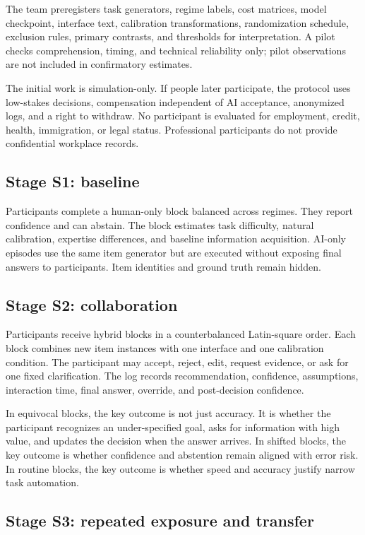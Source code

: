 \documentclass[conference]{IEEEtran}
\begin{document}
The team preregisters task generators, regime labels, cost matrices, model checkpoint, interface text, calibration transformations, randomization schedule, exclusion rules, primary contrasts, and thresholds for interpretation. A pilot checks comprehension, timing, and technical reliability only; pilot observations are not included in confirmatory estimates.

The initial work is simulation-only. If people later participate, the protocol uses low-stakes decisions, compensation independent of AI acceptance, anonymized logs, and a right to withdraw. No participant is evaluated for employment, credit, health, immigration, or legal status. Professional participants do not provide confidential workplace records.

\subsection{Stage S1: baseline}

Participants complete a human-only block balanced across regimes. They report confidence and can abstain. The block estimates task difficulty, natural calibration, expertise differences, and baseline information acquisition. AI-only episodes use the same item generator but are executed without exposing final answers to participants. Item identities and ground truth remain hidden.

\subsection{Stage S2: collaboration}

Participants receive hybrid blocks in a counterbalanced Latin-square order. Each block combines new item instances with one interface and one calibration condition. The participant may accept, reject, edit, request evidence, or ask for one fixed clarification. The log records recommendation, confidence, assumptions, interaction time, final answer, override, and post-decision confidence.

In equivocal blocks, the key outcome is not just accuracy. It is whether the participant recognizes an under-specified goal, asks for information with high value, and updates the decision when the answer arrives. In shifted blocks, the key outcome is whether confidence and abstention remain aligned with error risk. In routine blocks, the key outcome is whether speed and accuracy justify narrow task automation.

\subsection{Stage S3: repeated exposure and transfer}
\end{document}
